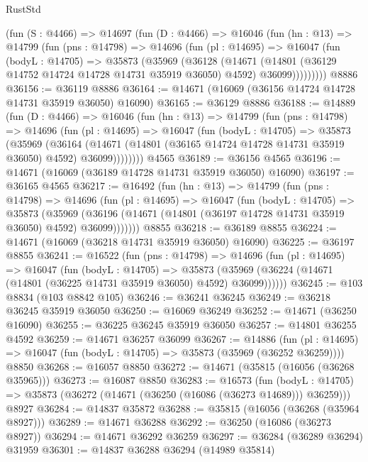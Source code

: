 \begin{lexlean}{RustStd}
\begin{coremodule}
    (fun (S : @4466) =>
    @14697
      (fun (D : @4466) =>
      @16046
        (fun (hn : @13) =>
        @14799
          (fun (pns : @14798) =>
          @14696
            (fun (pl : @14695) =>
            @16047
              (fun (bodyL : @14705) =>
              @35873
                (@35969
                  (@36128
                    (@14671
                      (@14801 (@36129 @14752 @14724 @14728 @14731 @35919 @36050) @4592)
                      @36099)))))))))
    @8886
@36156 := @36119 @8886
@36164 := @14671 (@16069 (@36156 @14724 @14728 @14731 @35919 @36050) @16090)
@36165 := @36129 @8886
@36188 := @14889
    (fun (D : @4466) =>
    @16046
      (fun (hn : @13) =>
      @14799
        (fun (pns : @14798) =>
        @14696
          (fun (pl : @14695) =>
          @16047
            (fun (bodyL : @14705) =>
            @35873
              (@35969
                (@36164
                  (@14671 (@14801 (@36165 @14724 @14728 @14731 @35919 @36050) @4592) @36099))))))))
    @4565
@36189 := @36156 @4565
@36196 := @14671 (@16069 (@36189 @14728 @14731 @35919 @36050) @16090)
@36197 := @36165 @4565
@36217 := @16492
    (fun (hn : @13) =>
    @14799
      (fun (pns : @14798) =>
      @14696
        (fun (pl : @14695) =>
        @16047
          (fun (bodyL : @14705) =>
          @35873
            (@35969
              (@36196 (@14671 (@14801 (@36197 @14728 @14731 @35919 @36050) @4592) @36099)))))))
    @8855
@36218 := @36189 @8855
@36224 := @14671 (@16069 (@36218 @14731 @35919 @36050) @16090)
@36225 := @36197 @8855
@36241 := @16522
    (fun (pns : @14798) =>
    @14696
      (fun (pl : @14695) =>
      @16047
        (fun (bodyL : @14705) =>
        @35873 (@35969 (@36224 (@14671 (@14801 (@36225 @14731 @35919 @36050) @4592) @36099))))))
@36245 := @103 @8834 (@103 @8842 @105)
@36246 := @36241 @36245
@36249 := @36218 @36245 @35919 @36050
@36250 := @16069 @36249
@36252 := @14671 (@36250 @16090)
@36255 := @36225 @36245 @35919 @36050
@36257 := @14801 @36255 @4592
@36259 := @14671 @36257 @36099
@36267 := @14886
    (fun (pl : @14695) => @16047 (fun (bodyL : @14705) => @35873 (@35969 (@36252 @36259))))
    @8850
@36268 := @16057 @8850
@36272 := @14671 (@35815 (@16056 (@36268 @35965)))
@36273 := @16087 @8850
@36283 := @16573
    (fun (bodyL : @14705) => @35873 (@36272 (@14671 (@36250 (@16086 (@36273 @14689))) @36259)))
    @8927
@36284 := @14837 @35872
@36288 := @35815 (@16056 (@36268 (@35964 @8927)))
@36289 := @14671 @36288
@36292 := @36250 (@16086 (@36273 @8927))
@36294 := @14671 @36292 @36259
@36297 := @36284 (@36289 @36294) @31959
@36301 := @14837 @36288 @36294 (@14989 @35814)

\end{coremodule}
\end{lexlean}
